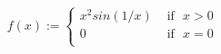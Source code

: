 \documentclass[preview]{standalone}
\begin{document}
\begin{align*}
f(x) := \begin{cases}x^{2}sin(1/x)  &  \text{ if} \ \ \  x > 0 \\0 &  \text{ if} \ \ \ x=0 \\\end{cases}
\end{align*}
\end{document}

